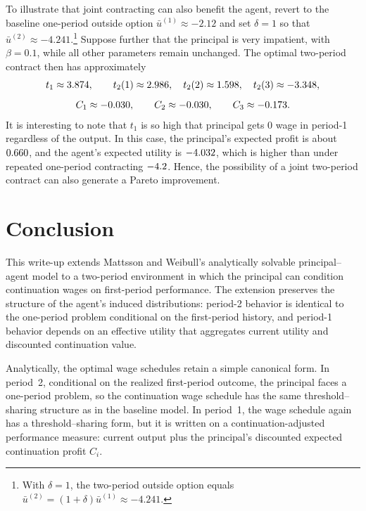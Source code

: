 \documentclass[12pt]{article}
\theoremstyle{definition}
\begin{document}
To illustrate that joint contracting can also benefit the agent, revert to the baseline one-period outside option \(\bar u^{(1)}\approx -2.12\) and set \(\delta=1\) 
so that \(\bar u^{(2)}\approx -4.241\).\footnote{With \(\delta=1\), the two-period outside option equals \(\bar u^{(2)}=(1+\delta)\bar u^{(1)}\approx -4.241\).} 
Suppose further that the principal is very impatient, with \(\beta=0.1\), while all other parameters remain unchanged. The optimal two-period contract then has approximately
\[
t_1 \approx 3.874,\qquad
t_2(1)\approx 2.986,\quad
t_2(2)\approx 1.598,\quad
t_2(3)\approx -3.348,
\]
\[
C_1 \approx -0.030,\qquad
C_2 \approx -0.030,\qquad
C_3 \approx -0.173.
\]
It is interesting to note that $t_1$ is so high that principal gets $0$ wage in period-1 regardless of the output. In this case, the principal’s 
expected profit is about \(0.660\), and the agent’s expected utility is \(-4.032\), which is higher than under repeated one-period 
contracting \(\fpeval{round(2*\Uoneperiodlowoutsideoption, 3)}\). 
Hence, the possibility of a joint two-period contract can also generate a Pareto improvement.
\section{Conclusion}

This write-up extends Mattsson and Weibull’s analytically solvable principal--agent model to a two-period environment in which the principal can 
condition continuation wages on first-period performance. The extension preserves the structure of the agent’s induced distributions: period-2 
behavior is identical to the one-period problem conditional on the first-period history, and period-1 behavior depends on an effective utility 
that aggregates current utility and discounted continuation value.

Analytically, the optimal wage schedules retain a simple canonical form. In period~2, conditional on the realized first-period outcome, 
the principal faces a one-period problem, so the continuation wage schedule has the same threshold--sharing structure as in the baseline model. 
In period~1, the wage schedule again has a threshold--sharing form, but it is written on a continuation-adjusted performance measure: 
current output plus the principal’s discounted expected continuation profit \(C_i\). 
\end{document}

